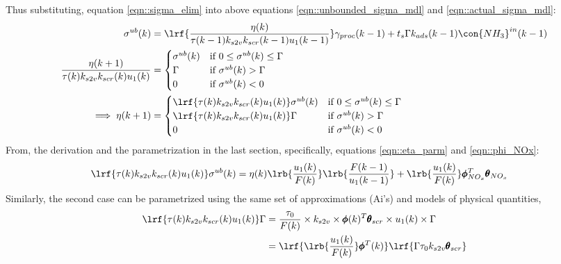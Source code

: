 Thus substituting, equation \ref{eqn::sigma_elim} into above equations \ref{eqn::unbounded_sigma_mdl} and \ref{eqn::actual_sigma_mdl}:
\begin{align}
        \sigma^{ub}(k) &= \lrf{\frac{\eta(k)}{\tau(k-1) k_{s2v} k_{scr}(k-1) u_1(k-1)}} \gamma_{proc}(k-1) + t_s \Gamma k_{ads}(k-1) \con{NH_3}^{in}(k-1)\\
        \frac{\eta(k+1)}{\tau(k) k_{s2v} k_{scr}(k) u_1(k)} &=
        \begin{cases}
                                \sigma^{ub}(k)     & \text{if }  0 \leq \sigma^{ub}(k) \leq \Gamma\\
                                \Gamma             & \text{if }  \sigma^{ub}(k) > \Gamma \\
                                0                  & \text{if }  \sigma^{ub}(k) < 0
        \end{cases} \\
        \implies \eta(k+1) &=
        \begin{cases}
        \lrf{\tau(k) k_{s2v} k_{scr}(k) u_1(k)}\sigma^{ub}(k)         & \text{if }
                0 \leq \sigma^{ub}(k) \leq \Gamma\\
        \lrf{\tau(k) k_{s2v} k_{scr}(k) u_1(k)} \Gamma                & \text{if }
                \sigma^{ub}(k) > \Gamma \\
        0                                                             & \text{if }
                \sigma^{ub}(k) < 0
        \end{cases}
        \label{eqn::eta_cases}
\end{align}
From, the derivation and the parametrization in the last section, specifically, equations \ref{eqn::eta_parm} and
\ref{eqn::phi_NOx}:
\begin{align}
        \lrf{\tau(k) k_{s2v} k_{scr}(k) u_1(k)}\sigma^{ub}(k) &=
        \eta(k) \lrb{\frac{u_1(k)}{F(k)}} \lrb{\frac{F(k-1)}{u_1(k-1)}}
        +\lrb{\frac{u_1(k)}{F(k)}} \pmb \phi_{NO_x}^T \pmb \theta_{NO_x}
        \label{eqn::sigma_ub_param}
\end{align}
Similarly, the second case can be parametrized using the same set of approximations (Ai's) and models of physical quantities,
\begin{align*}
        \lrf{\tau(k) k_{s2v} k_{scr}(k) u_1(k)} \Gamma  &= \frac{\tau_0}{F(k)} \times k_{s2v} \times \pmb \phi(k)^T \pmb \theta_{scr} \times u_1(k) \times \Gamma\\
        &= \lrf{\lrb{\frac{u_1(k)}{F(k)}} \pmb \phi^T(k) } \lrf{\Gamma \tau_0 k_{s2v} \pmb \theta_{scr}}
\end{align*}
